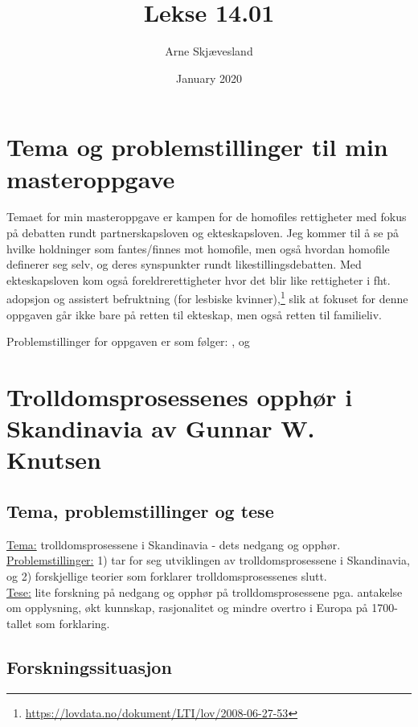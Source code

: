 \documentclass[12pt]{article}
\title{Lekse 14.01}
\author{Arne Skjævesland}
\date{January 2020}
\begin{document}
\maketitle

\section{Tema og problemstillinger til min masteroppgave}
Temaet for min masteroppgave er kampen for de homofiles rettigheter med fokus på debatten rundt partnerskapsloven og 
ekteskapsloven. Jeg kommer til å se på hvilke holdninger som fantes/finnes mot homofile, men også hvordan homofile 
definerer seg selv, og deres synspunkter rundt likestillingsdebatten. Med ekteskapsloven kom også foreldrerettigheter 
hvor det blir like rettigheter i fht. adopsjon og assistert befruktning (for lesbiske  kvinner),\footnote{\url{https://lovdata.no/dokument/LTI/lov/2008-06-27-53}} slik at fokuset for denne oppgaven går 
ikke bare på retten til ekteskap, men også retten til familieliv.

Problemstillinger for oppgaven er som følger: , og 

\section{Trolldomsprosessenes opphør i Skandinavia av Gunnar W. Knutsen}

\subsection{Tema, problemstillinger og tese}
\underline{Tema:} trolldomsprosessene i Skandinavia - dets nedgang og opphør. \\
\underline{Problemstillinger:} 1) tar for seg utviklingen av trolldomsprosessene i Skandinavia, og 2) forskjellige 
teorier som forklarer trolldomsprosessenes slutt. \\
\underline{Tese:} lite forskning på nedgang og opphør på trolldomsprosessene pga. antakelse om opplysning, økt 
kunnskap, rasjonalitet og mindre overtro i Europa på 1700-tallet som forklaring.

\subsection{Forskningssituasjon}
\end{document}
